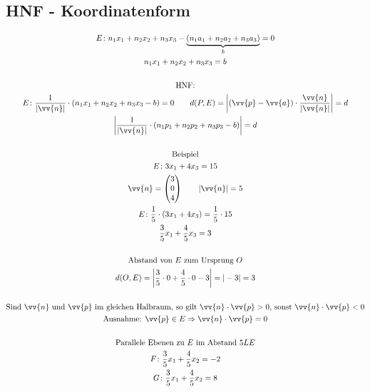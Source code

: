 \subsection{HNF - Koordinatenform}
\begin{gather*}
  E \colon n_1x_1 + n_2x_2 + n_3x_3 - \underbrace{(n_1a_1 + n_2a_2 + n_3a_3)}_b = 0 \\
  n_1x_1 + n_2x_2 + n_3x_3 = b \\\\
  \text{HNF:} \\
  E \colon \frac{1}{|\vv{n}|} \cdot (n_1x_1 + n_2x_2 + n_3x_3 - b) = 0 \qquad d(P, E) = \left|(\vv{p} - \vv{a}) \cdot \frac{\vv{n}}{|\vv{n}|}\right| = d \\
  \left|\frac{1}{|\vv{n}|} \cdot (n_1p_1 + n_2p_2 + n_3p_3 - b)\right| = d \\\\
  \text{Beispiel} \\
  E \colon 3x_1 + 4x_3 = 15 \\
  \vv{n} = \begin{pmatrix}3 \\ 0 \\ 4\end{pmatrix} \qquad |\vv{n}| = 5 \\
  E \colon \frac{1}{5} \cdot (3x_1 + 4x_3) = \frac{1}{5} \cdot 15 \\
  \frac{3}{5}x_1 + \frac{4}{5}x_3 = 3 \\\\
  \text{Abstand von $E$ zum Ursprung $O$} \\
  d(O, E) = \left|\frac{3}{5} \cdot 0 + \frac{4}{5} \cdot 0 - 3\right| = |-3| = 3 \\\\
  \text{Sind $\vv{n}$ und $\vv{p}$ im gleichen Halbraum, so gilt $\vv{n} \cdot \vv{p} > 0$, sonst $\vv{n} \cdot \vv{p} < 0$} \\
  \text{Ausnahme: $\vv{p} \in E \Rightarrow \vv{n} \cdot \vv{p} = 0$} \\\\
  \text{Parallele Ebenen zu $E$ im Abstand $5LE$} \\
  F \colon \frac{3}{5}x_1 + \frac{4}{5}x_2 = -2 \\
  G \colon \frac{3}{5}x_1 + \frac{4}{5}x_2 = 8
\end{gather*}
\newpage

